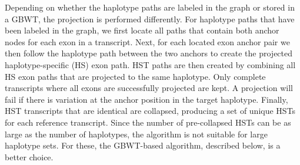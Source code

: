 \documentclass[11pt]{ucthesis}
\begin{document}
Depending on whether the haplotype paths are labeled in the graph or stored in a GBWT, the projection is performed differently. For haplotype paths that have been labeled in the graph, we first locate all paths that contain both anchor nodes for each exon in a transcript. Next, for each located exon anchor pair we then follow the haplotype path between the two anchors to create the projected haplotype-specific (HS) exon path. HST paths are then created by combining all HS exon paths that are projected to the same haplotype. Only complete transcripts where all exons are successfully projected are kept. A projection will fail if there is variation at the anchor position in the target haplotype. Finally, HST transcripts that are identical are collapsed, producing a set of unique HSTs for each reference transcript. Since the number of pre-collapsed HSTs can be as large as the number of haplotypes, the algorithm is not suitable for large haplotype sets. For these, the GBWT-based algorithm, described below, is a better choice.

\end{document}
